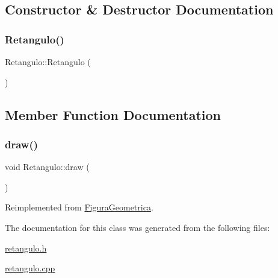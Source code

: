 \subsection{Constructor \& Destructor Documentation}
\mbox{\label{class_retangulo_ac21a81cae046920c8bee401bcb879562}} 
\subsubsection{\texorpdfstring{Retangulo()}{Retangulo()}}
{\footnotesize\ttfamily Retangulo\+::\+Retangulo (\begin{DoxyParamCaption}{ }\end{DoxyParamCaption})}



\subsection{Member Function Documentation}
\mbox{\label{class_retangulo_a48cb75fe7cd048727879c25485976444}} 
\subsubsection{\texorpdfstring{draw()}{draw()}}
{\footnotesize\ttfamily void Retangulo\+::draw (\begin{DoxyParamCaption}{ }\end{DoxyParamCaption})\hspace{0.3cm}{\ttfamily [virtual]}}



Reimplemented from \hyperlink{class_figura_geometrica_a417090ea2019fc1d58cdb345167aebea}{Figura\+Geometrica}.



The documentation for this class was generated from the following files\+:\begin{DoxyCompactItemize}
\item 
\hyperlink{retangulo_8h}{retangulo.\+h}\item 
\hyperlink{retangulo_8cpp}{retangulo.\+cpp}\end{DoxyCompactItemize}
